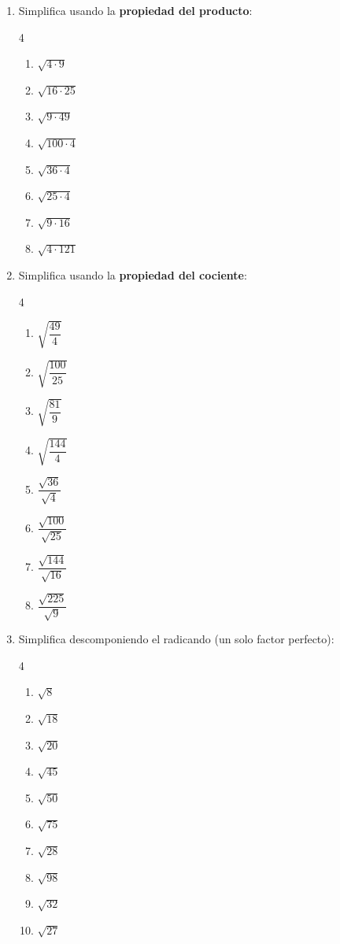 \documentclass[11pt, letterpaper]{article}
\begin{document}
\begin{enumerate}[label=\textbf{\arabic*.}, leftmargin=*]
  \item Simplifica usando la \textbf{propiedad del producto}:
  \begin{multicols}{4}
  \begin{enumerate}[label=\alph*)]
    \item $\sqrt{4 \cdot 9}$
    \item $\sqrt{16 \cdot 25}$
    \item $\sqrt{9 \cdot 49}$
    \item $\sqrt{100 \cdot 4}$
    \item $\sqrt{36 \cdot 4}$
    \item $\sqrt{25 \cdot 4}$
    \item $\sqrt{9 \cdot 16}$
    \item $\sqrt{4 \cdot 121}$
  \end{enumerate}
  \end{multicols}

  \item Simplifica usando la \textbf{propiedad del cociente}:
  \begin{multicols}{4}
  \begin{enumerate}[label=\alph*)]
    \item $\sqrt{\dfrac{49}{4}}$
    \item $\sqrt{\dfrac{100}{25}}$
    \item $\sqrt{\dfrac{81}{9}}$
    \item $\sqrt{\dfrac{144}{4}}$
    \item $\dfrac{\sqrt{36}}{\sqrt{4}}$
    \item $\dfrac{\sqrt{100}}{\sqrt{25}}$
    \item $\dfrac{\sqrt{144}}{\sqrt{16}}$
    \item $\dfrac{\sqrt{225}}{\sqrt{9}}$
  \end{enumerate}
  \end{multicols}

  \item Simplifica descomponiendo el radicando (un solo factor perfecto):
  \begin{multicols}{4}
  \begin{enumerate}[label=\alph*)]
    \item $\sqrt{8}$
    \item $\sqrt{18}$
    \item $\sqrt{20}$
    \item $\sqrt{45}$
    \item $\sqrt{50}$
    \item $\sqrt{75}$
    \item $\sqrt{28}$
    \item $\sqrt{98}$
    \item $\sqrt{32}$
    \item $\sqrt{27}$
  \end{enumerate}
  \end{multicols}
\end{enumerate}
\end{document}
